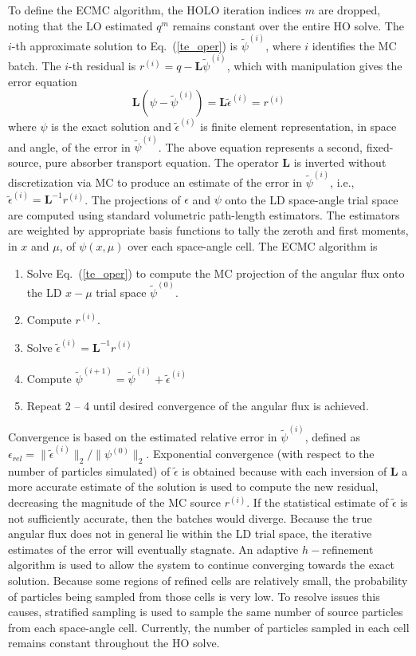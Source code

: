 \documentclass[10pt,twocolumn,pdftex,superscriptaddress]{anstrans}
\renewcommand{\eqref}[1]{(\ref{#1})}
\newcommand{\B}[1]{\ensuremath{\mathbf{#1}}}
\begin{document}
To define the ECMC algorithm, the HOLO iteration indices
$m$ are dropped, noting that the LO estimated $q^{m}$ remains constant over the entire HO solve.
The $i$-th approximate solution to Eq.~\eqref{te_oper} is $\tilde{\psi}^{(i)}$, where
$i$ identifies the MC batch.
The $i$-th residual is $r^{(i)} = q - \B L\tilde{\psi}^{(i)}$, which with manipulation gives the error equation
\begin{equation}
\B L (\psi - \tilde{\psi}^{(i)}) = \B L \tilde{\epsilon}^{(i)} = r^{(i)}
\end{equation}
where $\psi$ is the exact solution and $\tilde{\epsilon}^{(i)}$ is finite element
representation, in space and angle, of the error in
$\tilde{\psi}^{(i)}$. The above equation represents a second, fixed-source, pure
absorber transport equation.
The operator $\B L$ is inverted without discretization via MC to produce an
estimate of the error in $\tilde{\psi}^{(i)}$, i.e., $\tilde{\epsilon}^{(i)} = \B
L^{-1} r^{(i)}$.
The projections of $\epsilon$ and $\psi$ onto the LD space-angle trial space are computed using standard
volumetric path-length
estimators.  The estimators are weighted by appropriate basis functions 
to tally the zeroth and first moments, in $x$ and $\mu$, of 
$\psi(x,\mu)$ over each space-angle cell.
  The ECMC algorithm is
\begin{enumerate}
\item Solve Eq.~\eqref{te_oper} to compute the MC projection of the angular
flux onto the LD $x-\mu$ trial space $\tilde\psi^{(0)}$.
\item Compute $r^{(i)}$.
\item Solve $\tilde{\epsilon}^{(i)} = \B L^{-1} r^{(i)}$
\item Compute $\tilde\psi^{(i+1)} = \tilde\psi^{(i)}
+ \tilde\epsilon^{(i)}$
\item Repeat 2 -- 4 until desired convergence of the angular flux is achieved.
\end{enumerate}

Convergence is based on the estimated relative error in $\tilde \psi^{(i)}$, defined as
$\epsilon_{rel} = \| \tilde \epsilon^{(i)} \|_2/\| \psi^{(0)} \|_2$.
Exponential convergence (with respect to the number
of particles simulated) of $\tilde \epsilon$ is obtained because with each inversion of $\B L$ a
more accurate estimate of the solution is used to compute the new residual, decreasing
the magnitude of the MC source $r^{(i)}$.  If the statistical estimate of $\tilde\epsilon$ is not sufficiently
accurate, then the batches would diverge.
Because the true angular flux does not in general lie within the LD trial space, the
iterative estimates of the error will eventually stagnate.  An adaptive $h-$refinement algorithm is used
to allow the system to continue converging towards the exact solution. 
Because some regions of refined cells are relatively small, the probability of particles being
sampled from those cells is very low.  To resolve issues this causes, stratified sampling is
used to sample the same number of source particles from each space-angle cell.  
Currently, the number of particles sampled
in each cell remains constant throughout the HO solve.
\end{document}
